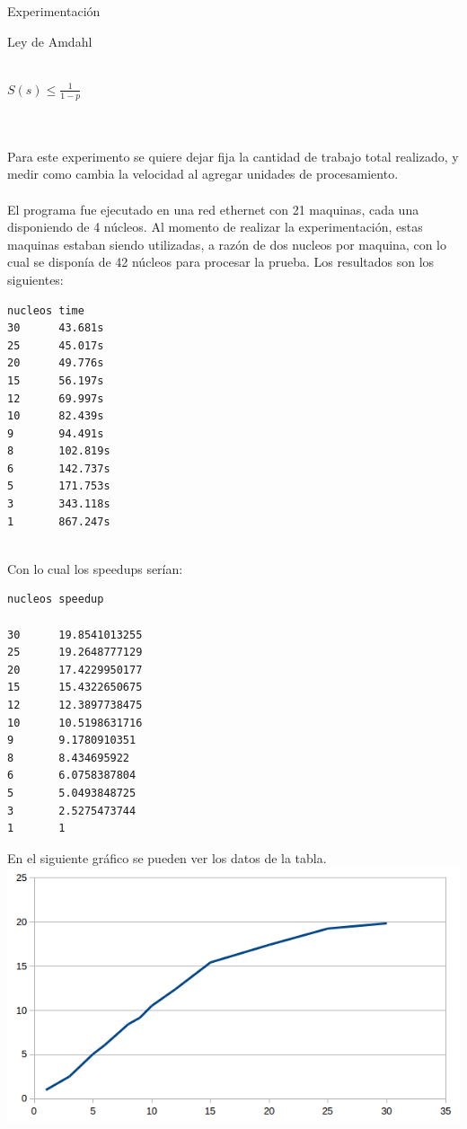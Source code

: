 \begin{section}{Experimentación}
\begin{subsection}{Ley de Amdahl}
~\\
~\\
\begin{center}
$S(s) \leq  \frac{1}{1-p}$
\end{center}
~\\
~\\
\newpage
Para este experimento se quiere dejar fija la cantidad de trabajo total realizado, y medir como cambia la velocidad al agregar unidades de procesamiento. 
~\\
~\\
El programa fue ejecutado en una red ethernet con 21 maquinas, cada una disponiendo de 4 núcleos. Al momento de realizar la experimentación, estas maquinas estaban siendo utilizadas, a razón de dos nucleos por maquina, con lo cual se disponía de 42 núcleos para procesar la prueba. Los resultados son los siguientes:
~\\
\begin{verbatim}
nucleos time
30      43.681s
25      45.017s
20      49.776s
15      56.197s
12      69.997s
10      82.439s
9       94.491s
8       102.819s
6       142.737s
5       171.753s
3       343.118s
1       867.247s
\end{verbatim}
~\\
Con lo cual los speedups serían:
~\\
\begin{verbatim}
nucleos speedup

30      19.8541013255
25      19.2648777129
20      17.4229950177
15      15.4322650675
12      12.3897738475
10      10.5198631716
9       9.1780910351
8       8.434695922
6       6.0758387804
5       5.0493848725
3       2.5275473744
1       1

\end{verbatim}

En el siguiente gráfico se pueden ver los datos de la tabla.
~\\
\includegraphics{AmdahlSpeedup}


\end{subsection}
\end{section}
